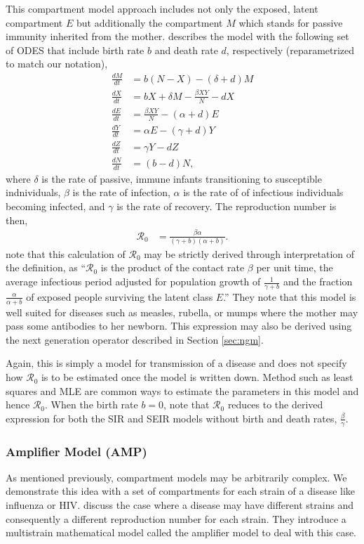 \documentclass[12pt]{article}
\newcommand{\rr}{\ensuremath{\mathcal{R}_0}}
\begin{document}
This compartment model approach includes not only the exposed, latent compartment $E$ but additionally the compartment $M$ which stands for passive immunity inherited from the mother.  \cite{hethcote2000} describes the model with the following set of ODES that include birth rate $b$ and death rate $d$, respectively (reparametrized to match our notation),
\begin{align*}
  \frac{dM}{dt} &= b(N-X) - (\delta + d) M \\
  \frac{dX}{dt} &= bX + \delta M - \frac{\beta XY}{N} - dX\\
  \frac{dE}{dt} &= \frac{\beta XY}{N} - (\alpha + d) E\\ 
  \frac{dY}{dt} &= \alpha E - (\gamma + d) Y \\
  \frac{dZ}{dt} &= \gamma Y - dZ \\
  \frac{dN}{dt} &= (b-d)N,
\end{align*}
where $\delta$ is the rate of passive, immune infants transitioning to susceptible indnividuals, $\beta$ is the rate of infection, $\alpha$ is the rate of of infectious individuals becoming infected, and $\gamma$ is the rate of recovery.  The reproduction number is then,
\begin{align}\label{eq:r0-mseir}
\rr &= \frac{ \beta \alpha}{ (\gamma + b)(\alpha + b)}.
\end{align}
\cite{hethcote2000} note that this calculation of $\rr$ may be strictly derived through interpretation of the definition, as ``$\rr$ is the product of the contact rate $\beta$ per unit time, the average infectious period adjusted for population growth of $\frac{1}{\gamma + b}$ and the fraction $\frac{\alpha}{\alpha + b}$ of exposed people surviving the latent class $E$.''  They note that this model is well suited for diseases such as measles, rubella, or mumps where the mother may pass some antibodies to her newborn.  This expression may also be derived using the next generation operator described in Section \ref{sec:ngm}.

Again, this is simply a model for transmission of a disease and does not specify how $\rr$ is to be estimated once the model is written down.  Method such as least squares and MLE are common ways to estimate the parameters in this model and hence $\rr$.  When the birth rate $b=0$, note that $\rr$ reduces to the derived expression for both the SIR and SEIR models without birth and death rates, $\frac{\beta}{\gamma}$.




\subsubsection{Amplifier Model (AMP)}
As mentioned previously, compartment models may be arbitrarily complex.  We demonstrate this idea with a set of compartments for each strain of a disease like influenza or HIV.  \cite{blower2004} discuss the case where a disease may have different strains and consequently a different reproduction number for each strain.  They introduce a multistrain mathematical model called the amplifier model to deal with this case.
\end{document}
